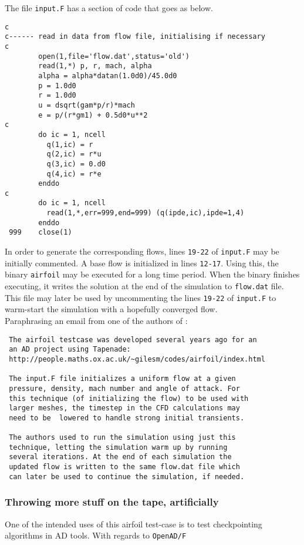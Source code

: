 \noindent The file \texttt{input.F} has a section of code that goes as below.\\

\begin{lstlisting}[language=myfortran]
c
c------ read in data from flow file, initialising if necessary
c
        open(1,file='flow.dat',status='old')
        read(1,*) p, r, mach, alpha
        alpha = alpha*datan(1.0d0)/45.0d0
        p = 1.0d0
        r = 1.0d0
        u = dsqrt(gam*p/r)*mach
        e = p/(r*gm1) + 0.5d0*u**2
c
        do ic = 1, ncell
          q(1,ic) = r
          q(2,ic) = r*u
          q(3,ic) = 0.d0
          q(4,ic) = r*e
        enddo
c
        do ic = 1, ncell
          read(1,*,err=999,end=999) (q(ipde,ic),ipde=1,4)
        enddo
 999    close(1)
\end{lstlisting}
\hfill \break
In order to generate the corresponding flows, lines \texttt{19-22} of \texttt{input.F} may be initially commented. A base flow is initialized in lines \texttt{12-17}. Using this, the binary \texttt{airfoil} may be executed for a long time period. When the binary finishes executing, it writes the solution at the end of the simulation to \texttt{flow.dat} file. This file may later be used by uncommenting the lines \texttt{19-22} of \texttt{input.F} to warm-start the simulation with a hopefully converged flow.\\

\noindent Paraphrasing an email from one of the authors of \cite{Giles_2005}:

\begin{verbatim}
 The airfoil testcase was developed several years ago for an
 an AD project using Tapenade:
 http://people.maths.ox.ac.uk/~gilesm/codes/airfoil/index.html

 The input.F file initializes a uniform flow at a given 
 pressure, density, mach number and angle of attack. For 
 this technique (of initializing the flow) to be used with
 larger meshes, the timestep in the CFD calculations may
 need to be  lowered to handle strong initial transients.

 The authors used to run the simulation using just this
 technique, letting the simulation warm up by running 
 several iterations. At the end of each simulation the
 updated flow is written to the same flow.dat file which
 can later be used to continue the simulation, if needed.
\end{verbatim}
\subsubsection{Throwing more stuff on the tape, artificially}
One of the intended uses of this airfoil test-case is to test checkpointing algorithms in AD tools. With regards to \texttt{OpenAD/F}